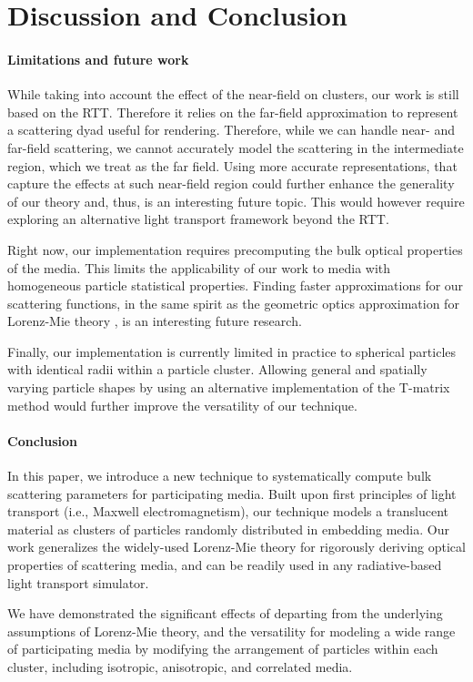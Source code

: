 \section{Discussion and Conclusion}
\label{sec:waveoptics:conclusion}

\paragraph{Limitations and future work}

While taking into account the effect of the near-field on clusters, our work is still based on the RTT. Therefore it relies on the far-field approximation to represent a scattering dyad useful for rendering. Therefore, while we can handle near- and far-field scattering, we cannot accurately model the scattering in the intermediate region, which we treat as the far field. Using more accurate representations, that capture the effects at such near-field region could further enhance the generality of our theory and, thus, is an interesting future topic. This would however require exploring an alternative light transport framework beyond the RTT.

Right now, our implementation requires precomputing the bulk optical properties of the media. This limits the applicability of our work to media with homogeneous particle statistical properties. Finding faster approximations for our scattering functions, in the same spirit as the geometric optics approximation for Lorenz-Mie theory \cite{glantschnig1981light}, is an interesting future research. 

Finally, our implementation is currently limited in practice to spherical particles with identical radii within a particle cluster. Allowing general and spatially varying particle shapes by using an alternative implementation of the T-matrix method would further improve the versatility of our technique.

\paragraph{Conclusion}

In this paper, we introduce a new technique to systematically compute bulk scattering parameters for participating media. Built upon first principles of light transport (i.e., Maxwell electromagnetism), our technique models a translucent material as clusters of particles randomly distributed in embedding media. Our work generalizes the widely-used Lorenz-Mie theory for rigorously deriving optical properties of scattering media, and can be readily used in any radiative-based light transport simulator. 

We have demonstrated the significant effects of departing from the underlying assumptions of Lorenz-Mie theory, and the versatility for modeling a wide range of participating media by modifying the arrangement of particles within each cluster, including isotropic, anisotropic, and correlated media.
